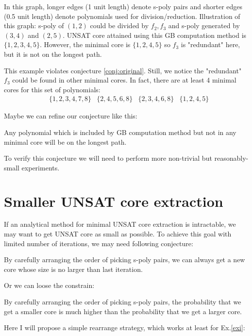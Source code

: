 \begin{Example}
In this graph, longer edges (1 unit length) denote s-poly pairs and shorter edges (0.5 unit length) denote
polynomials used for division/reduction. Illustration of this graph: s-poly of $(1,2)$ could be divided by $f_2,f_3$
and s-poly generated by $(3,4)$ and $(2,5)$. UNSAT core attained using this GB computation method is $\{1,2,3,4,5\}$.
However, the minimal core is $\{1,2,4,5\}$ so $f_3$ is "redundant" here, but it is not 
on the longest path.
\end{Example}

This example violates conjecture \ref{conj:original}. Still, we notice the "redundant" $f_3$ could be found in other
minimal cores. In fact, there are at least 4 minimal cores for this set of polynomials:
\begin{align*}
& \{1,2,3,4,7,8\}
& \{2,4,5,6,8\}
& \{2,3,4,6,8\}
& \{1,2,4,5\}
\end{align*}

Maybe we can refine our conjecture like this:
\begin{Conjecture}
\label{conj:refine}
Any polynomial which is included by GB computation method but not in any minimal core will be on the longest path.
\end{Conjecture}

To verify this conjecture we will need to perform more non-trivial but reasonably-small experiments.

\section{Smaller UNSAT core extraction}
If an analytical method for minimal UNSAT core extraction is intractable, we may want to get UNSAT core as small as possible.
To achieve this goal with limited number of iterations, we may need following conjecture:
\begin{Conjecture}
By carefully arranging the order of picking s-poly pairs, we can always get a new core whose size is no larger than
last iteration.
\end{Conjecture}

Or we can loose the constrain:
\begin{Conjecture}
By carefully arranging the order of picking s-poly pairs, the probability that we get a smaller core
is much higher than the probability that we get a larger core.
\end{Conjecture}

Here I will propose a simple rearrange strategy, which works at least for Ex.\ref{exi}:

